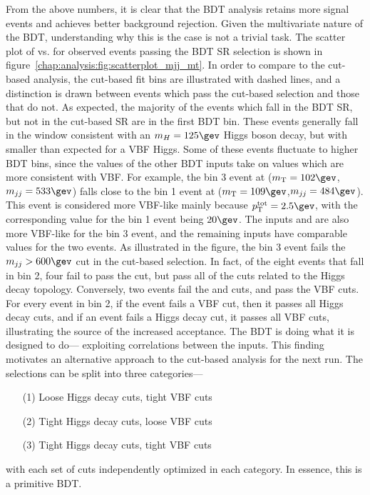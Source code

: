From the above numbers, it is clear that the BDT analysis retains more
signal events and achieves better background rejection. Given the
multivariate nature of the BDT, understanding why this is the case is
not a trivial task. The scatter plot of \mjj vs. \mT for
observed events passing the BDT SR selection is shown in
figure~\ref{chap:analysis:fig:scatterplot_mjj_mt}. In order to compare
to the cut-based analysis, the cut-based fit bins are illustrated with
dashed lines, and a distinction is drawn between events which pass the
cut-based selection and those that do not. As expected, the majority
of the events which fall in the BDT SR, but not in the cut-based SR are
in the first BDT bin. These events generally fall in the \mT window
consistent with an $m_H = 125 \gev$ Higgs boson decay, but with \mjj
smaller than expected for a VBF Higgs. Some of these events fluctuate
to higher BDT bins, since the values of the other BDT inputs take on
values which are more consistent with VBF. For example, the bin 3 event at ($\mT = 102
\gev$,$\mjj = 533 \gev$) falls close to the bin 1 event at ($\mT = 109
\gev$,$\mjj = 484 \gev$). This event is considered more VBF-like
mainly because $\pTtot = 2.5 \gev$, with the corresponding value for
the bin 1 event being $20 \gev$. The inputs \dphill and \mll are also
more VBF-like for the bin 3 event, and the remaining inputs have
comparable values for the two events. As illustrated in the figure,
the bin 3 event fails the $\mjj > 600 \gev$ cut in the cut-based
selection. In fact, of the eight events that fall in bin 2, four fail
to pass the \mjj cut, but pass all of the cuts related to the Higgs
decay topology. Conversely, two events fail the \mll and \dphill cuts,
and pass the VBF cuts. For every event in bin 2, if the event fails a
VBF cut, then it passes all Higgs decay cuts, and if an event fails a
Higgs decay cut, it passes all VBF cuts, illustrating the source of
the increased acceptance. The BDT is doing what it is designed to do---
exploiting correlations between the inputs. This finding motivates an
alternative approach to the cut-based analysis for the next
run. The selections can be split into three categories---

\begin{enumerate}[nolistsep]
\item[(1)] Loose Higgs decay cuts, tight VBF cuts
\item[(2)] Tight Higgs decay cuts, loose VBF cuts
\item[(3)] Tight Higgs decay cuts, tight VBF cuts
\end{enumerate}

\noindent
with each set of cuts independently optimized in each category. In essence, this is
a primitive BDT.


